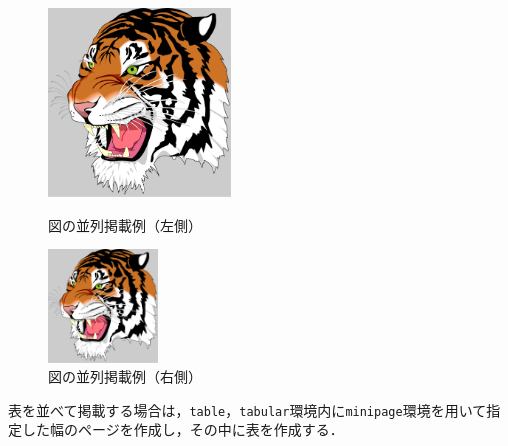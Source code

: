 \documentclass[a4j,11pt]{ujreport}
\begin{document}
\begin{figure}[ht]
	\centering
	\begin{minipage}[b]{0.5\hsize}
		\centering
		\includegraphics[clip,height=5.0cm]{fig/tiger.pdf}
		\caption{図の並列掲載例（左側）}
		\label{fig:ExampleParallelFigureLeft}
	\end{minipage}%
	\begin{minipage}[b]{0.5\hsize}
		\centering
		\includegraphics[clip,height=3.0cm]{fig/tiger.pdf}
		\caption{図の並列掲載例（右側）}
		\label{fig:ExampleParallelFigureRight}
	\end{minipage}
\end{figure}

表を並べて掲載する場合は，\texttt{table}，\texttt{tabular}環境内に\texttt{minipage}環境を用いて指定した幅のページを作成し，その中に表を作成する．

%
\end{document}
